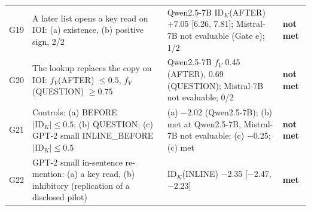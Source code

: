 \begin{tabular}{p{}p{}p{}p{}}
G19 & A later list opens a key read on IOI: (a) existence, (b) positive sign, 2/2 & Qwen2.5-7B $\mathrm{ID}_K$(AFTER) $+$7.05 [6.26, 7.81]; Mistral-7B not evaluable (Gate e); 1/2 & \textbf{not met} \\
G20 & The lookup replaces the copy on IOI: $f_V$(AFTER) $\leq 0.5$, $f_V$(QUESTION) $\geq 0.75$ & Qwen2.5-7B $f_V$ 0.45 (AFTER), 0.69 (QUESTION); Mistral-7B not evaluable; 0/2 & \textbf{not met} \\
G21 & Controls: (a) BEFORE $|\mathrm{ID}_K| \leq 0.5$; (b) QUESTION; (c) GPT-2 small INLINE\_BEFORE $|\mathrm{ID}_K| \leq 0.5$ & (a) $-$2.02 (Qwen2.5-7B); (b) met at Qwen2.5-7B, Mistral-7B not evaluable; (c) $-$0.25; (c) met & \textbf{not met} \\
G22 & GPT-2 small in-sentence re-mention: (a) a key read, (b) inhibitory (replication of a disclosed pilot) & $\mathrm{ID}_K$(INLINE) $-$2.35 [$-$2.47, $-$2.23] & \textbf{met} \\
\bottomrule
\end{tabular}
